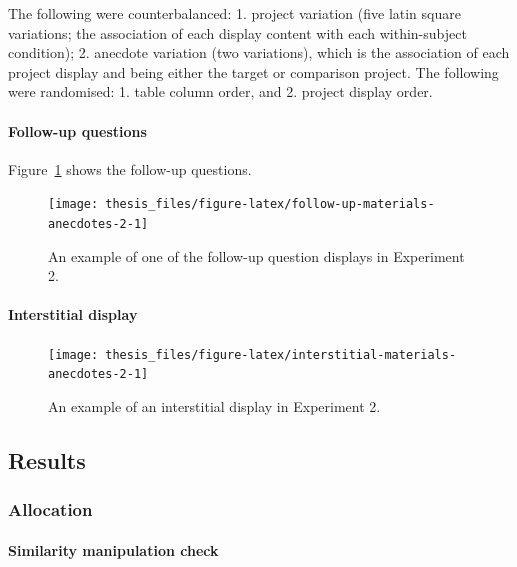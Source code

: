 \documentclass[a4paper, nobind, dvipsnames]{templates/ociamthesis}
\theoremstyle{definition}
\theoremstyle{definition}
\theoremstyle{definition}
\theoremstyle{definition}
\theoremstyle{remark}
\begin{document}
The following were counterbalanced: 1. project variation (five latin square
variations; the association of each display content with each within-subject
condition); 2. anecdote variation (two variations), which is the association of
each project display and being either the target or comparison project. The
following were randomised: 1. table column order, and 2. project display order.

\hypertarget{follow-up-materials-anecdotes-2}{%
\paragraph{Follow-up questions}\label{follow-up-materials-anecdotes-2}}

Figure~\ref{fig:follow-up-materials-anecdotes-2} shows the follow-up questions.



\begin{figure}
\texttt{[image: thesis\_files/figure-latex/follow-up-materials-anecdotes-2-1]} \caption{An example of one of the follow-up question displays in Experiment 2.}\label{fig:follow-up-materials-anecdotes-2}
\end{figure}

\hypertarget{interstitial-materials-anecdotes-2}{%
\paragraph{Interstitial display}\label{interstitial-materials-anecdotes-2}}



\begin{figure}
\texttt{[image: thesis\_files/figure-latex/interstitial-materials-anecdotes-2-1]} \caption{An example of an interstitial display in Experiment 2.}\label{fig:interstitial-materials-anecdotes-2}
\end{figure}

\hypertarget{results-anecdotes-2-appendix}{%
\subsection{Results}\label{results-anecdotes-2-appendix}}

\hypertarget{allocation-3}{%
\subsubsection{Allocation}\label{allocation-3}}

\hypertarget{similarity-manipulation-check}{%
\paragraph{Similarity manipulation check}\label{similarity-manipulation-check}}
\end{document}
